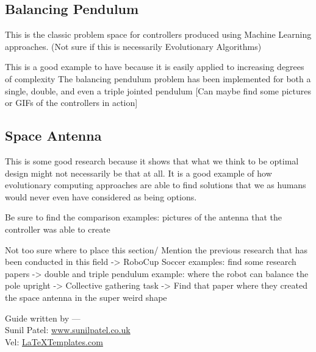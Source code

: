 \subsection{Balancing Pendulum}

This is the classic problem space for controllers produced using Machine Learning approaches. (Not sure if this is necessarily Evolutionary Algorithms)

This is a good example to have because it is easily applied to increasing degrees of complexity
The balancing pendulum problem has been implemented for both a single, double, and even a triple jointed pendulum
[Can maybe find some pictures or GIFs of the controllers in action]

\subsection{Space Antenna}

This is some good research because it shows that what we think to be optimal design might not necessarily be that at all. It is a good example of how evolutionary computing approaches are able to find solutions that we as humans would never even have considered as being options.

Be sure to find the comparison examples: pictures of the antenna that the controller was able to create


Not too sure where to place this section/
Mention the previous research that has been conducted in this field
-> RoboCup Soccer examples: find some research papers
-> double and triple pendulum example: where the robot can balance the pole upright
-> Collective gathering task
-> Find that paper where they created the space antenna in the super weird shape











































\begin{flushright}
Guide written by ---\\
Sunil Patel: \href{http://www.sunilpatel.co.uk}{www.sunilpatel.co.uk}\\
Vel: \href{http://www.LaTeXTemplates.com}{LaTeXTemplates.com}
\end{flushright}
